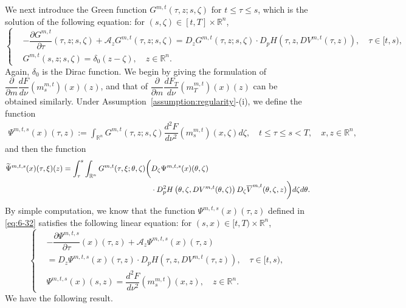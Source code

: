 \documentclass[11pt]{article}
\numberwithin{equation}{section}
\newcommand{\brn}{{\mathbb{R}^n}}
\newcommand{\1}{\mbox{1\hspace{-1mm}I}}
\begin{document}
We next introduce the Green function $G^{m,t}(\tau,z;s,\zeta)$ for $t\le \tau\le s$, which is the solution of the following equation: for $(s,\zeta)\in[t,T]\times\brn$,
\begin{equation}\label{eq:6-31}
\left\{
\begin{aligned}
    &-\dfrac{\partial G^{m,t}}{\partial\tau}(\tau,z;s,\zeta)+\mathcal{A}_{z}G^{m,t}(\tau,z;s,\zeta)=D_{z}G^{m,t}(\tau,z;s,\zeta)\cdot D_p H\left(\tau,z,DV^{m,t}(\tau,z)\right),\quad \tau\in[t,s),\\
    &G^{m,t}(s,z;s,\zeta)=\delta_0(z-\zeta),\quad z\in\brn.
\end{aligned}
\right.
\end{equation}
Again, $\delta_0$ is the Dirac function. We begin by giving the formulation of $\dfrac{\partial}{\partial m}\dfrac{dF}{d\nu}\left(m^{m,t}_s\right)(x)(z)$, and that of $\dfrac{\partial}{\partial m}\dfrac{dF_T}{d\nu}\left(m^{m,t}_T\right)(x)(z)$ can be obtained similarly. Under Assumption~\ref{assumption:regularity}-(i), we define the function
\begin{align}
    \Psi^{m,t,s}(x)(\tau,z):=\int_{\brn}G^{m,t}(\tau,z;s,\zeta)\dfrac{d^{2}F}{d\nu^{2}}\left(m^{m,t}_s\right)(x,\zeta)d\zeta, \quad t\le\tau\le s< T,\quad x,z\in\brn,\label{eq:6-32}
\end{align}
and then the function
\begin{align}
    \widetilde{\Psi}^{m,t,s}(x)(\tau,\xi)(z)=\int_{\tau}^{s}\int_{\brn}G^{m,t}(\tau,\xi;\theta,\zeta)\bigg(&D_{\zeta}\Psi^{m,t,s}(x)(\theta,\zeta) \notag \\
    &\cdot D_{p}^{2}H\left(\theta,\zeta,DV^{m,t}(\theta,\zeta)\right)D_{\zeta} \overline{V}^{m,t}(\theta,\zeta,z)\bigg)d\zeta d\theta. \label{eq:6-32'}
\end{align}
By simple computation, we know that the function $\Psi^{m,t,s}(x)(\tau,z)$ defined in \eqref{eq:6-32} satisfies the following linear equation: for $(s,x)\in[t,T)\times\brn$,
\begin{equation}\label{PDE:Psi}
\left\{
\begin{aligned}
    &-\dfrac{\partial \Psi^{m,t,s}}{\partial\tau}(x)(\tau,z) +\mathcal{A}_{z} \Psi^{m,t,s}(x)(\tau,z) \\
    &=D_{z}\Psi^{m,t,s}(x)(\tau,z) \cdot D_p H\left(\tau,z,DV^{m,t}(\tau,z)\right),\quad \tau\in[t,s),\\
    &\Psi^{m,t,s}(x)(s,z)=\dfrac{d^{2}F}{d\nu^{2}}\left(m^{m,t}_s\right)(x,z),\quad z\in\brn.
\end{aligned}
\right.
\end{equation}
We have the following result.
\end{document}
